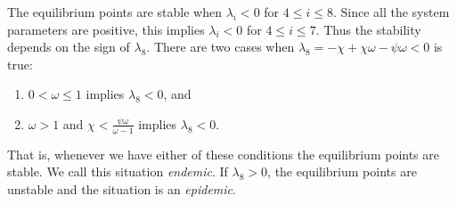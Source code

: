 \documentclass[11pt]{article}
\begin{document}
	The equilibrium points are stable when $\lambda_i < 0$ for $4 \leq i \leq 8$.
	Since all the system parameters are positive, this implies $\lambda_i < 0$ for $4 \leq i \leq 7$.
	Thus the stability depends on the sign of $\lambda_8$.
	There are two cases when $\lambda_8 = - \chi + \chi \omega - \psi \omega < 0$ is true:
	\begin{enumerate}
		\item $0 < \omega \leq 1$ implies $\lambda_8 < 0$, and
		\item $\omega > 1$ and $\chi < \frac{\psi \omega}{\omega - 1}$ implies $\lambda_8 < 0$.
	\end{enumerate}
	That is, whenever we have either of these conditions the equilibrium points are stable.
	We call this situation \textit{endemic}.
	If $\lambda_8 > 0$, the equilibrium points are unstable and the situation is an \textit{epidemic}.



\end{document}
